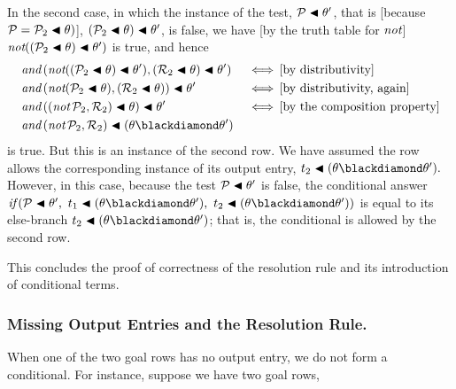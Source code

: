 \documentclass[runningheads]{llncs}
\DeclareMathOperator{\uand}{\emph{and}\,}
\DeclareMathOperator{\unot}{\emph{not}\kern-.0pt}
\DeclareMathOperator{\uiff}{\iff}
\begin{document}
In the second case, in which the instance of the test, 
$\mathcal{P}\blacktriangleleft \theta'$, that is
[because $\mathcal{P} = 
{\mathcal{P}}_{2} \blacktriangleleft \theta)$],
$({{\mathcal{P}}_{2} \blacktriangleleft \theta})\blacktriangleleft \theta'$, is false, we have [by the truth table for $\unot$] $\unot(({\expsub{\mathcal{P}}{2} \apply \theta})\apply \theta')$ is true, and hence
\begin{align*}
&\uand(\unot(({\expsub{\mathcal{P}}{2} \apply \theta})\apply \theta'),
(\expsub{\mathcal{R}}{2}\apply \theta)\apply \theta'
)  \,  &&\uiff 
  \text{[by distributivity]} \\
&\uand(\unot({\expsub{\mathcal{P}}{2} \apply \theta}),
(\expsub{\mathcal{R}}{2}\apply \theta))\apply \theta' \,  &&\uiff 
  \text{[by distributivity, again]} \\
  &\uand((\unot{\expsub{\mathcal{P}}{2}},
\expsub{\mathcal{R}}{2})\apply \theta) \apply \theta' \, &&\uiff  
 \text{[by the composition property]} \\
&\uand(\unot{\expsub{\mathcal{P}}{2}},
\expsub{\mathcal{R}}{2})\apply (\theta \compose \theta')
   \end{align*}
is true.  But this is an instance of the second row.  We have assumed the row allows the corresponding instance of its output entry, $\expsub{t}{2} \apply (\theta \compose \theta').$ However,  in this case, because the test
$\mathcal{P}\blacktriangleleft \theta'$ is false, the conditional answer $\cond 
     {\mathcal{P}\apply \theta'} 
     {\expsub{t}{1} \apply (\theta \compose \theta')} 
     {\expsub{t}{2} \apply (\theta \compose \theta')}$ is equal to its else-branch $\expsub{t}{2} \apply (\theta \compose \theta')$;  that is, the conditional is allowed by the second row.


This concludes the proof of correctness of the resolution rule and its introduction of conditional terms.  

\subsubsection{Missing Output Entries and the Resolution Rule.}  When one of the two goal rows has no output entry, we do not form a conditional.  For instance, suppose we have two goal rows, 
\end{document}
